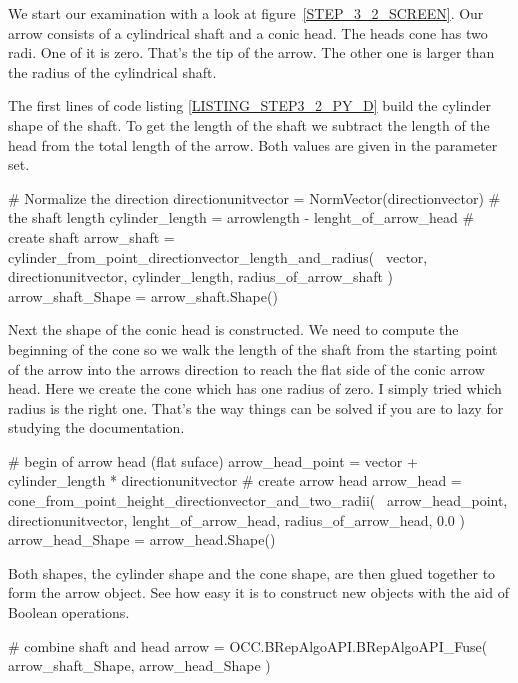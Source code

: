 We start our examination with a look at figure~\ref{STEP_3_2_SCREEN}.
Our arrow consists of a cylindrical shaft and a conic head.
The heads cone has two radi.
One of it is zero.
That's the tip of the arrow.
The other one is larger than the radius of the cylindrical shaft.

The first lines of  code listing \ref{LISTING_STEP3_2_PY_D} build the cylinder shape of the shaft.
To get the length of the shaft we subtract the length of the head from the total length of the arrow.
Both values are given in the parameter set.
\begin{python}
    # Normalize the direction
    directionunitvector = NormVector(directionvector)
    # the shaft length
    cylinder_length = arrowlength - lenght_of_arrow_head
    # create shaft
    arrow_shaft = cylinder_from_point_directionvector_length_and_radius( \
                                                    vector, 
                                                    directionunitvector,
                                                    cylinder_length,
                                                    radius_of_arrow_shaft ) 
    arrow_shaft_Shape = arrow_shaft.Shape()
\end{python}
Next the shape of the conic head is constructed.
We need to compute the beginning of the cone so we walk the length of the shaft from the starting point of the arrow into the arrows direction to reach the flat side of the conic arrow head.
Here we create the cone which has one radius of zero.
I simply tried which radius is the right one.
That's the way things can be solved if you are to lazy for studying the documentation.
\begin{python}
    # begin of arrow head (flat suface)
    arrow_head_point = vector + cylinder_length * directionunitvector
    # create arrow head
    arrow_head = cone_from_point_height_directionvector_and_two_radii(  \
                                                    arrow_head_point, 
                                                    directionunitvector,
                                                    lenght_of_arrow_head,
                                                    radius_of_arrow_head,
                                                    0.0 )
    arrow_head_Shape = arrow_head.Shape()
\end{python}
Both shapes, the cylinder shape and the cone shape, are then glued together to form the arrow object.
See how easy it is to construct new objects with the aid of Boolean operations. 
\begin{python}
    # combine shaft and head
    arrow = OCC.BRepAlgoAPI.BRepAlgoAPI_Fuse(   arrow_shaft_Shape, 
                                                arrow_head_Shape )       
\end{python}
